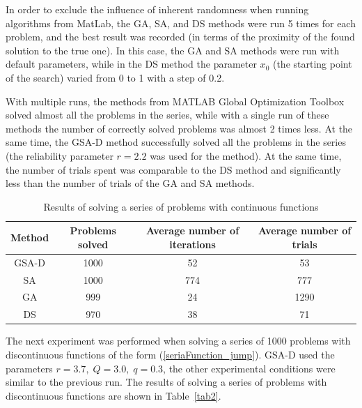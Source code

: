 \documentclass[runningheads]{llncs}
\begin{document}
In order to exclude the influence of inherent randomness when running algorithms from MatLab, the GA, SA, and DS methods were run 5 times for each problem, and the best result was recorded (in terms of the proximity of the found solution to the true one). In this case, the GA and SA methods were run with default parameters, while in the DS method the parameter $x_0$ (the starting point of the search) varied from 0 to 1 with a step of 0.2.

With multiple runs, the methods from MATLAB Global Optimization Toolbox solved almost all the problems in the series, while with a single run of these methods the number of correctly solved problems was almost 2 times less. At the same time, the GSA-D method successfully solved all the problems in the series (the reliability parameter $r=2.2$ was used for the method). At the same time, the number of trials spent was comparable to the DS method and significantly less than the number of trials of the GA and SA methods.

\begin{table}[ht]
	\caption{Results of solving a series of problems with continuous functions}
	\label{tab1}
	\begin{center}
		\begin{tabular}{c|c|c|c}
			\hline
			Method & Problems solved & Average number of iterations & Average number of trials \\
			\hline
                                GSA-D & 1000  &  52  &  53 \\
                                \hline
                                SA    &  1000  &  774  &  777  \\
			\hline
			GA    &   999  &  24  &  1290  \\
			\hline
                                DS    &  970  & 38  &  71  \\
			\hline
		\end{tabular}
	\end{center}
\end{table}

The next experiment was performed when solving a series of 1000 problems with discontinuous functions of the form (\ref{seriaFunction_jump}).  GSA-D used the parameters $r=3.7, \; Q=3.0, \; q=0.3$, the other experimental conditions were similar to the previous run. The results of solving a series of problems with discontinuous functions are shown in Table~\ref{tab2}.
\end{document}

